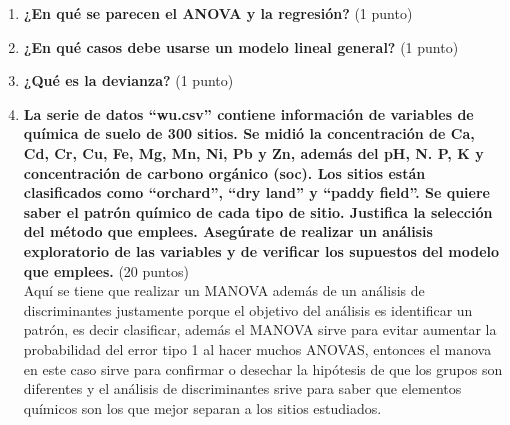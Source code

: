 \documentclass[
]{article}
\begin{document}
\begin{enumerate}
  \textbf{¿Cómo puede evaluar diferentes modelos?} (1 punto)
\item
  \textbf{¿En qué se parecen el ANOVA y la regresión?} (1 punto)
\item
  \textbf{¿En qué casos debe usarse un modelo lineal general?} (1 punto)
\item
  \textbf{¿Qué es la devianza?} (1 punto)
\item
  \textbf{La serie de datos ``wu.csv'' contiene información de variables
  de química de suelo de 300 sitios. Se midió la concentración de Ca,
  Cd, Cr, Cu, Fe, Mg, Mn, Ni, Pb y Zn, además del pH, N. P, K y
  concentración de carbono orgánico (soc). Los sitios están clasificados
  como ``orchard'', ``dry land'' y ``paddy field''. Se quiere saber el
  patrón químico de cada tipo de sitio. Justifica la selección del
  método que emplees. Asegúrate de realizar un análisis exploratorio de
  las variables y de verificar los supuestos del modelo que emplees.}
  (20 puntos)\\
  Aquí se tiene que realizar un MANOVA además de un análisis de
  discriminantes justamente porque el objetivo del análisis es
  identificar un patrón, es decir clasificar, además el MANOVA sirve
  para evitar aumentar la probabilidad del error tipo 1 al hacer muchos
  ANOVAS, entonces el manova en este caso sirve para confirmar o
  desechar la hipótesis de que los grupos son diferentes y el análisis
  de discriminantes srive para saber que elementos químicos son los que
  mejor separan a los sitios estudiados.
\end{enumerate}
\end{document}
